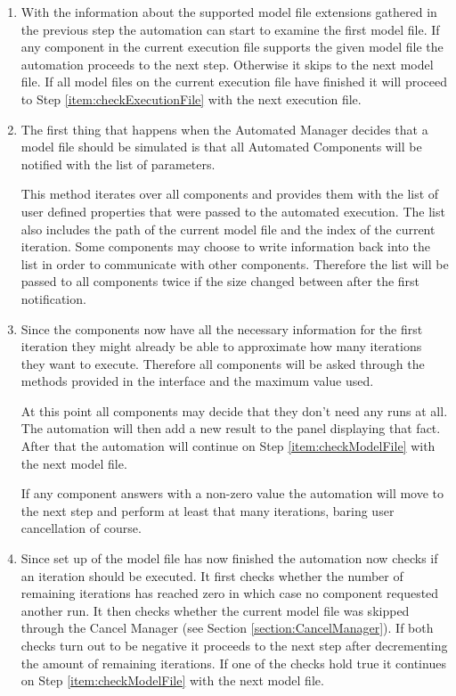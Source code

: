 \begin{enumerate}
 \item \label{item:checkModelFile} With the information about the supported model file extensions
gathered in the previous step the automation can start to examine the first model file. If any component
in the current execution file supports the given model file the automation proceeds to the next step.
Otherwise it skips to the next model file. If all model files on the current execution file
have finished it will proceed to Step \ref{item:checkExecutionFile} with the next execution file.

 \item \label{item:notifyObservers} The first thing that happens when the Automated Manager decides
that a model file should be simulated is that all Automated Components will be notified with the
list of parameters. 

This method iterates over all components and provides them with the list
of user defined properties that were passed to the automated execution. The list also includes
the path of the current model file and the index of the current iteration. Some components
may choose to write information back into the list in order to communicate with other
components. Therefore the list will be passed to all components twice if the size changed
between after the first notification.

 \item \label{item:askForRuns} Since the components now have all the necessary information for
the first iteration they might already be able to approximate how many iterations they want to
execute. Therefore all components will be asked through the methods provided in the interface
and the maximum value used.

At this point all components may decide that they don't need any runs
at all. The automation will then add a new result to the panel displaying that fact. After that
the automation will continue on Step \ref{item:checkModelFile} with the next model file.

If any component answers with a non-zero value the automation will move to the next step and
perform at least that many iterations, baring user cancellation of course.

 \item \label{item:checkIteration} Since set up of the model file has now finished the 
automation now checks if an iteration should be executed. It first checks whether the
number of remaining iterations has reached zero in which case no component requested
another run. It then checks whether the current model file was skipped through the 
Cancel Manager (see Section \ref{section:CancelManager}). If both checks turn out to 
be negative it proceeds to the next step after decrementing the amount of remaining
iterations. If one of the checks hold true it continues on Step \ref{item:checkModelFile}
with the next model file.


\end{enumerate}
